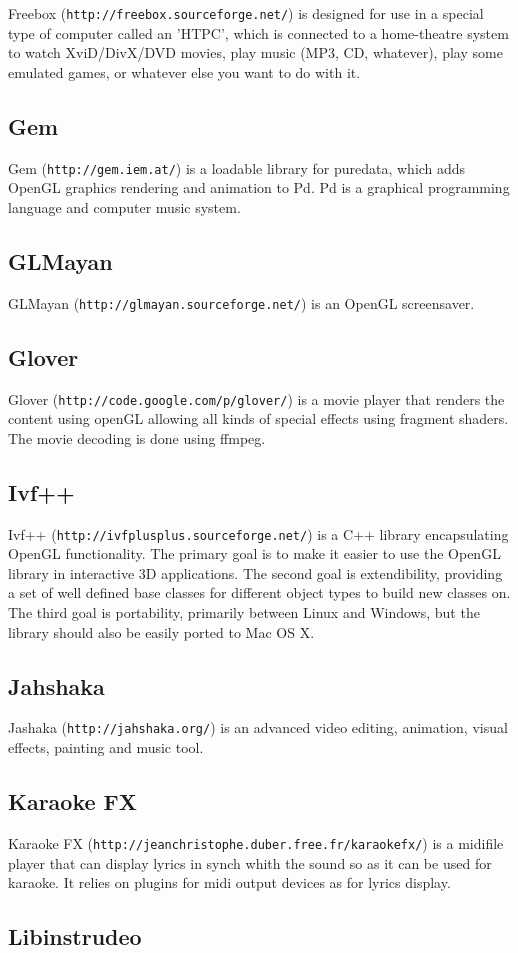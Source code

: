 Freebox ({\tt http://freebox.sourceforge.net/}) is designed for use in a special type of computer called an 'HTPC', which is connected to a home-\/theatre system to watch XviD/DivX/DVD movies, play music (MP3, CD, whatever), play some emulated games, or whatever else you want to do with it.\subsection{Gem}\label{ftgl-projects_gem}
Gem ({\tt http://gem.iem.at/}) is a loadable library for puredata, which adds OpenGL graphics rendering and animation to Pd. Pd is a graphical programming language and computer music system.\subsection{GLMayan}\label{ftgl-projects_glmayab}
GLMayan ({\tt http://glmayan.sourceforge.net/}) is an OpenGL screensaver.\subsection{Glover}\label{ftgl-projects_glover}
Glover ({\tt http://code.google.com/p/glover/}) is a movie player that renders the content using openGL allowing all kinds of special effects using fragment shaders. The movie decoding is done using ffmpeg.\subsection{Ivf++}\label{ftgl-projects_ivfplusplus}
Ivf++ ({\tt http://ivfplusplus.sourceforge.net/}) is a C++ library encapsulating OpenGL functionality. The primary goal is to make it easier to use the OpenGL library in interactive 3D applications. The second goal is extendibility, providing a set of well defined base classes for different object types to build new classes on. The third goal is portability, primarily between Linux and Windows, but the library should also be easily ported to Mac OS X.\subsection{Jahshaka}\label{ftgl-projects_jahshaka}
Jashaka ({\tt http://jahshaka.org/}) is an advanced video editing, animation, visual effects, painting and music tool.\subsection{Karaoke FX}\label{ftgl-projects_karaokefx}
Karaoke FX ({\tt http://jeanchristophe.duber.free.fr/karaokefx/}) is a midifile player that can display lyrics in synch whith the sound so as it can be used for karaoke. It relies on plugins for midi output devices as for lyrics display.\subsection{Libinstrudeo}\label{ftgl-projects_libinstrudeo}
